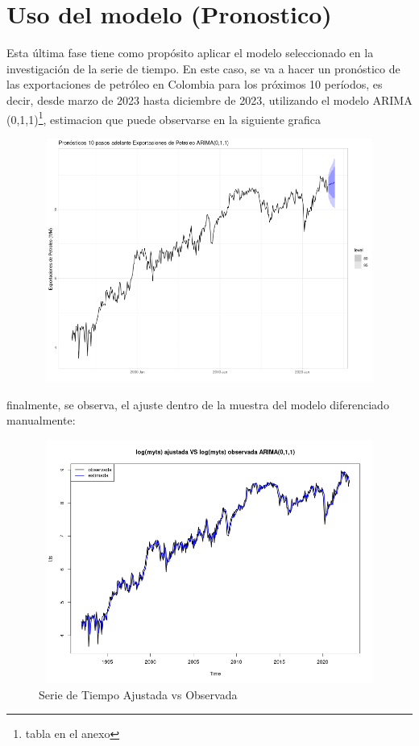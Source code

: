 \documentclass[11pt]{article}
\begin{document}
\section{Uso del modelo (Pronostico)}
    Esta última fase tiene como propósito aplicar el modelo seleccionado en la investigación de la serie de tiempo. En este caso, se va a hacer un pronóstico de las exportaciones de petróleo en Colombia para los próximos 10 períodos, es decir, desde marzo de 2023 hasta diciembre de 2023, utilizando el modelo ARIMA (0,1,1)\footnote{tabla en el anexo}, estimacion que puede observarse en la siguiente grafica
    \begin{center}
        \begin{figure}[!ht]
        \centering
        \includegraphics[width=16cm, height=8cm]{Imagenes/Pred.png}
        \end{figure}
    \end{center}
    finalmente, se observa, el ajuste dentro de la muestra del modelo diferenciado manualmente:
    \begin{center}
        \begin{figure}[!ht]
        \centering
        \includegraphics[width=16cm, height=8cm]{Imagenes/ajuste.png}
        \caption{Serie de Tiempo Ajustada vs Observada}
        \end{figure}
    \end{center}
\end{document}
